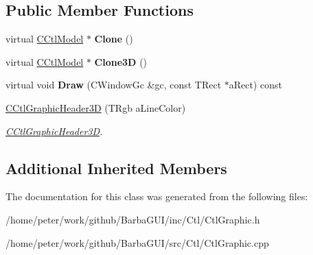 \subsection*{Public Member Functions}
\begin{DoxyCompactItemize}
\item 
\mbox{\label{classCCtlGraphicHeader3D_ab264d0e210428a2496ff927509e334c2}} 
virtual \hyperlink{classCCtlModel}{C\+Ctl\+Model} $\ast$ {\bfseries Clone} ()
\item 
\mbox{\label{classCCtlGraphicHeader3D_acfc7df2bcec257ac7313d52c782eb23a}} 
virtual \hyperlink{classCCtlModel}{C\+Ctl\+Model} $\ast$ {\bfseries Clone3D} ()
\item 
\mbox{\label{classCCtlGraphicHeader3D_a3253d46cdf047f1b0f477bc14a5971e2}} 
virtual void {\bfseries Draw} (C\+Window\+Gc \&gc, const T\+Rect $\ast$a\+Rect) const
\item 
\mbox{\label{classCCtlGraphicHeader3D_a21f6dd3abfa1c0db522bc17659d62f89}} 
\hyperlink{classCCtlGraphicHeader3D_a21f6dd3abfa1c0db522bc17659d62f89}{C\+Ctl\+Graphic\+Header3D} (T\+Rgb a\+Line\+Color)
\begin{DoxyCompactList}\small\item\em \hyperlink{classCCtlGraphicHeader3D}{C\+Ctl\+Graphic\+Header3D}. \end{DoxyCompactList}\end{DoxyCompactItemize}
\subsection*{Additional Inherited Members}


The documentation for this class was generated from the following files\+:\begin{DoxyCompactItemize}
\item 
/home/peter/work/github/\+Barba\+G\+U\+I/inc/\+Ctl/Ctl\+Graphic.\+h\item 
/home/peter/work/github/\+Barba\+G\+U\+I/src/\+Ctl/Ctl\+Graphic.\+cpp\end{DoxyCompactItemize}
